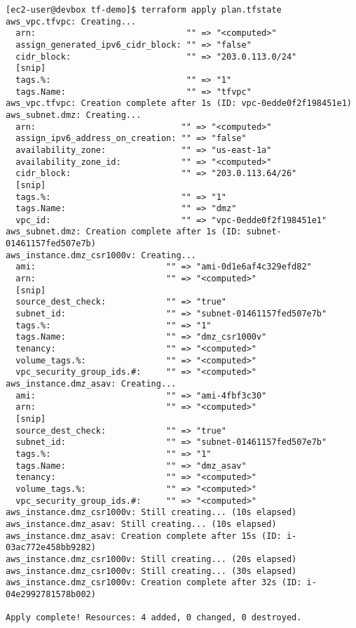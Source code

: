 \begin{verbatim}
[ec2-user@devbox tf-demo]$ terraform apply plan.tfstate
aws_vpc.tfvpc: Creating...
  arn:                              "" => "<computed>"
  assign_generated_ipv6_cidr_block: "" => "false"
  cidr_block:                       "" => "203.0.113.0/24"
  [snip]
  tags.%:                           "" => "1"
  tags.Name:                        "" => "tfvpc"
aws_vpc.tfvpc: Creation complete after 1s (ID: vpc-0edde0f2f198451e1)
aws_subnet.dmz: Creating...
  arn:                             "" => "<computed>"
  assign_ipv6_address_on_creation: "" => "false"
  availability_zone:               "" => "us-east-1a"
  availability_zone_id:            "" => "<computed>"
  cidr_block:                      "" => "203.0.113.64/26"
  [snip]
  tags.%:                          "" => "1"
  tags.Name:                       "" => "dmz"
  vpc_id:                          "" => "vpc-0edde0f2f198451e1"
aws_subnet.dmz: Creation complete after 1s (ID: subnet-01461157fed507e7b)
aws_instance.dmz_csr1000v: Creating...
  ami:                          "" => "ami-0d1e6af4c329efd82"
  arn:                          "" => "<computed>"
  [snip]
  source_dest_check:            "" => "true"
  subnet_id:                    "" => "subnet-01461157fed507e7b"
  tags.%:                       "" => "1"
  tags.Name:                    "" => "dmz_csr1000v"
  tenancy:                      "" => "<computed>"
  volume_tags.%:                "" => "<computed>"
  vpc_security_group_ids.#:     "" => "<computed>"
aws_instance.dmz_asav: Creating...
  ami:                          "" => "ami-4fbf3c30"
  arn:                          "" => "<computed>"
  [snip]
  source_dest_check:            "" => "true"
  subnet_id:                    "" => "subnet-01461157fed507e7b"
  tags.%:                       "" => "1"
  tags.Name:                    "" => "dmz_asav"
  tenancy:                      "" => "<computed>"
  volume_tags.%:                "" => "<computed>"
  vpc_security_group_ids.#:     "" => "<computed>"
aws_instance.dmz_csr1000v: Still creating... (10s elapsed)
aws_instance.dmz_asav: Still creating... (10s elapsed)
aws_instance.dmz_asav: Creation complete after 15s (ID: i-03ac772e458bb9282)
aws_instance.dmz_csr1000v: Still creating... (20s elapsed)
aws_instance.dmz_csr1000v: Still creating... (30s elapsed)
aws_instance.dmz_csr1000v: Creation complete after 32s (ID: i-04e2992781578b002)

Apply complete! Resources: 4 added, 0 changed, 0 destroyed.
\end{verbatim}

